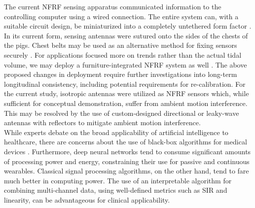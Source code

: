 \documentclass[journal,twoside,web]{ieeecolor}
\begin{document}
The current NFRF sensing apparatus communicated information to the controlling computer using a wired connection. The entire system can, with a suitable circuit design, be miniaturized into a completely untethered form factor \cite{zhouRadioFrequencyNearFieldSensor2023}. In its current form, sensing antennas were sutured onto the sides of the chests of the pigs. Chest belts may be used as an alternative method for fixing sensors securely \cite{sharmaWearableRadiofrequencySensing2020}. For applications focused more on trends rather than the actual tidal volume, we may deploy a furniture-integrated NFRF system as well \cite{zhangFurnitureIntegratedRespirationSensors2021}.  The above proposed changes in deployment require further investigations into long-term longitudinal consistency, including potential requirements for re-calibration. For the current study, isotropic antennas were utilized as NFRF sensors which, while sufficient for conceptual demonstration, suffer from ambient motion interference. This may be resolved by the use of custom-designed directional or leaky-wave antennas with reflectors to mitigate ambient motion interference. \\
While experts debate on the broad applicability of artificial intelligence to healthcare, there are concerns about the use of black-box algorithms for medical devices \cite{amannExplainabilityArtificialIntelligence2020}. Furthermore, deep neural networks tend to consume significant amounts of processing power and energy, constraining their use for passive and continuous wearables. Classical signal processing algorithms, on the other hand, tend to fare much better in computing power. The use of an interpretable algorithm for combining multi-channel data, using well-defined metrics such as SIR and linearity, can be advantageous for clinical applicability.
\end{document}
